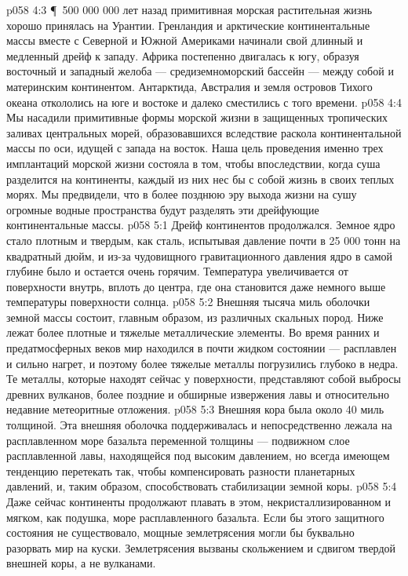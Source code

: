 \vs p058 4:3 \P\ 500 000 000 лет назад примитивная морская растительная жизнь хорошо принялась на Урантии. Гренландия и арктические континентальные массы вместе с Северной и Южной Америками начинали свой длинный и медленный дрейф к западу. Африка постепенно двигалась к югу, образуя восточный и западный желоба --- средиземноморский бассейн --- между собой и материнским континентом. Антарктида, Австралия и земля островов Тихого океана откололись на юге и востоке и далеко сместились с того времени.
\vs p058 4:4 Мы насадили примитивные формы морской жизни в защищенных тропических заливах центральных морей, образовавшихся вследствие раскола континентальной массы по оси, идущей с запада на восток. Наша цель проведения именно трех имплантаций морской жизни состояла в том, чтобы впоследствии, когда суша разделится на континенты, каждый из них нес бы с собой жизнь в своих теплых морях. Мы предвидели, что в более позднюю эру выхода жизни на сушу огромные водные пространства будут разделять эти дрейфующие континентальные массы.
\vs p058 5:1 Дрейф континентов продолжался. Земное ядро стало плотным и твердым, как сталь, испытывая давление почти в 25 000 тонн на квадратный дюйм, и из\hyp{}за чудовищного гравитационного давления ядро в самой глубине было и остается очень горячим. Температура увеличивается от поверхности внутрь, вплоть до центра, где она становится даже немного выше температуры поверхности солнца.
\vs p058 5:2 Внешняя тысяча миль оболочки земной массы состоит, главным образом, из различных скальных пород. Ниже лежат более плотные и тяжелые металлические элементы. Во время ранних и предатмосферных веков мир находился в почти жидком состоянии --- расплавлен и сильно нагрет, и поэтому более тяжелые металлы погрузились глубоко в недра. Те металлы, которые находят сейчас у поверхности, представляют собой выбросы древних вулканов, более поздние и обширные извержения лавы и относительно недавние метеоритные отложения.
\vs p058 5:3 Внешняя кора была около 40 миль толщиной. Эта внешняя оболочка поддерживалась и непосредственно лежала на расплавленном море базальта переменной толщины --- подвижном слое расплавленной лавы, находящейся под высоким давлением, но всегда имеющем тенденцию перетекать так, чтобы компенсировать разности планетарных давлений, и, таким образом, способствовать стабилизации земной коры.
\vs p058 5:4 Даже сейчас континенты продолжают плавать в этом, некристаллизированном и мягком, как подушка, море расплавленного базальта. Если бы этого защитного состояния не существовало, мощные землетрясения могли бы буквально разорвать мир на куски. Землетрясения вызваны скольжением и сдвигом твердой внешней коры, а не вулканами.
